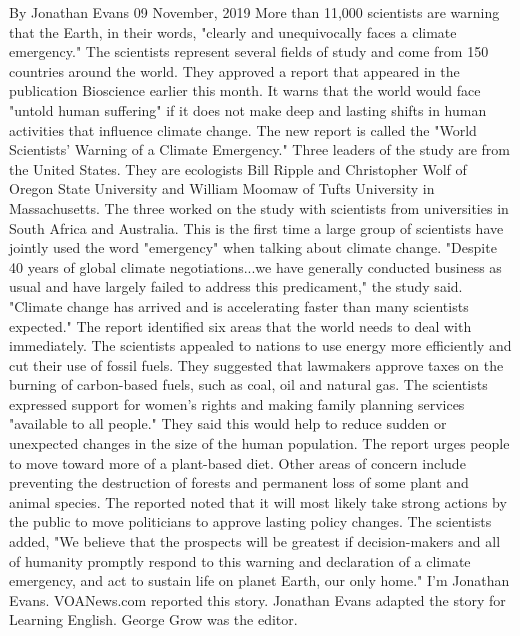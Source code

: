 By Jonathan Evans
09 November, 2019
More than 11,000 scientists are warning that the Earth, in their words, "clearly and unequivocally faces a climate emergency."
The scientists represent several fields of study and come from 150 countries around the world. They approved a report that appeared in the publication Bioscience earlier this month. It warns that the world would face "untold human suffering" if it does not make deep and lasting shifts in human activities that influence climate change.
The new report is called the "World Scientists' Warning of a Climate Emergency." Three leaders of the study are from the United States. They are ecologists Bill Ripple and Christopher Wolf of Oregon State University and William Moomaw of Tufts University in Massachusetts. The three worked on the study with scientists from universities in South Africa and Australia.
This is the first time a large group of scientists have jointly used the word "emergency" when talking about climate change.
"Despite 40 years of global climate negotiations...we have generally conducted business as usual and have largely failed to address this predicament," the study said. "Climate change has arrived and is accelerating faster than many scientists expected."
The report identified six areas that the world needs to deal with immediately. The scientists appealed to nations to use energy more efficiently and cut their use of fossil fuels. They suggested that lawmakers approve taxes on the burning of carbon-based fuels, such as coal, oil and natural gas.
The scientists expressed support for women's rights and making family planning services "available to all people." They said this would help to reduce sudden or unexpected changes in the size of the human population.
The report urges people to move toward more of a plant-based diet.
Other areas of concern include preventing the destruction of forests and permanent loss of some plant and animal species.
The reported noted that it will most likely take strong actions by the public to move politicians to approve lasting policy changes.
The scientists added, "We believe that the prospects will be greatest if decision-makers and all of humanity promptly respond to this warning and declaration of a climate emergency, and act to sustain life on planet Earth, our only home."
I'm Jonathan Evans.
VOANews.com reported this story. Jonathan Evans adapted the story for Learning English. George Grow was the editor.

